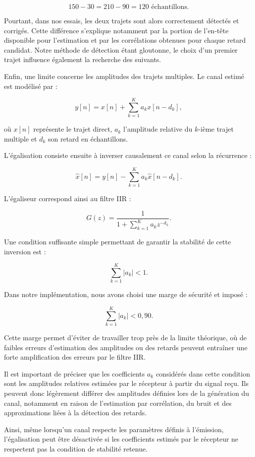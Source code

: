 \documentclass[a4paper,12pt]{report}
\begin{document}
$$
150-30 = 210-90 = 120\text{ échantillons}.
$$

Pourtant, dans nos essais, les deux trajets sont alors correctement détectés et corrigés. Cette différence s'explique notamment par la portion de l'en-tête disponible pour l'estimation et par les corrélations obtenues pour chaque retard candidat. Notre méthode de détection étant gloutonne, le choix d'un premier trajet influence également la recherche des suivants.

Enfin, une limite concerne les amplitudes des trajets multiples. Le canal estimé est modélisé par :

$$
y[n] = x[n] + \sum_{k=1}^{K} a_k x[n-d_k],
$$

où $x[n]$ représente le trajet direct, $a_k$ l'amplitude relative du $k$-ième trajet multiple et $d_k$ son retard en échantillons.

L'égalisation consiste ensuite à inverser causalement ce canal selon la récurrence :

$$
\hat{x}[n]
=
y[n]
-
\sum_{k=1}^{K} a_k \hat{x}[n-d_k].
$$

L'égaliseur correspond ainsi au filtre IIR :

$$
G(z)
=
\frac{1}
{1+\displaystyle\sum_{k=1}^{K}a_kz^{-d_k}}.
$$

Une condition suffisante simple permettant de garantir la stabilité de cette inversion est :

$$
\sum_{k=1}^{K}|a_k| < 1.
$$

Dans notre implémentation, nous avons choisi une marge de sécurité et imposé :

$$
\boxed{\sum_{k=1}^{K}|a_k| < 0{,}90}.
$$

Cette marge permet d'éviter de travailler trop près de la limite théorique, où de faibles erreurs d'estimation des amplitudes ou des retards peuvent entraîner une forte amplification des erreurs par le filtre IIR.

Il est important de préciser que les coefficients $a_k$ considérés dans cette condition sont les amplitudes relatives estimées par le récepteur à partir du signal reçu. Ils peuvent donc légèrement différer des amplitudes définies lors de la génération du canal, notamment en raison de l'estimation par corrélation, du bruit et des approximations liées à la détection des retards.

Ainsi, même lorsqu'un canal respecte les paramètres définis à l'émission, l'égalisation peut être désactivée si les coefficients estimés par le récepteur ne respectent pas la condition de stabilité retenue.
\end{document}
